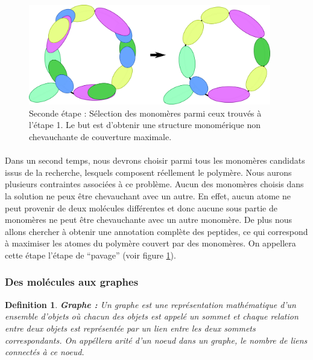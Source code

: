 \documentclass[12pt,french,twoside]{report}
\begin{document}
\begin{figure}[!ht]
  \begin{center}
    \includegraphics[width=400px]{Figures/s2m/Intro/tiling.png}
    \caption{\label{tiling_fig}Seconde étape : Sélection des monomères parmi ceux trouvés à l'étape 1.
    Le but est d'obtenir une structure monomérique non chevauchante de couverture maximale.}
  \end{center}
\end{figure}

\paragraph{}Dans un second temps, nous devrons choisir parmi tous les monomères candidats issus de la recherche, lesquels composent réellement le polymère.
Nous aurons plusieurs contraintes associées à ce problème.
Aucun des monomères choisis dans la solution ne peux être chevauchant avec un autre.
En effet, aucun atome ne peut provenir de deux molécules différentes et donc aucune sous partie de monomères ne peut être chevauchante avec un autre monomère.
De plus nous allons chercher à obtenir une annotation complète des peptides, ce qui correspond à maximiser les atomes du polymère couvert par des monomères.
On appellera cette étape l'étape de ``pavage'' (voir figure \ref{tiling_fig}).

\subsubsection{Des molécules aux graphes}

\newtheorem{definition}{Definition}
\begin{definition}\textbf{Graphe :}
 Un graphe est une représentation mathématique d'un ensemble d'objets où chacun des objets est appelé un sommet et
 chaque relation entre deux objets est représentée par un lien entre les deux sommets correspondants.
 On appéllera arité d'un noeud dans un graphe, le nombre de liens connectés à ce noeud.
\end{definition}
\end{document}
